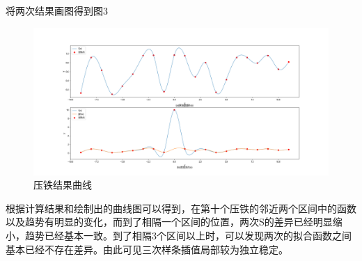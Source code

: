 \documentclass{article}
\begin{document}
将两次结果画图得到图3
	\begin{figure}[!h]
	
	\centering
	\includegraphics[scale=0.4]{S}
	\caption{\heiti{}压铁结果曲线}
	
\end{figure}


根据计算结果和绘制出的曲线图可以得到，在第十个压铁的邻近两个区间中的函数以及趋势有明显的变化，而到了相隔一个区间的位置，两次S的差异已经明显缩小，趋势已经基本一致。到了相隔3个区间以上时，可以发现两次的拟合函数之间基本已经不存在差异。由此可见三次样条插值局部较为独立稳定。
\end{document}
